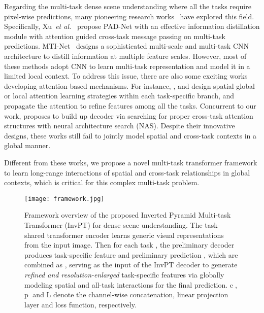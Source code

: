\documentclass[runningheads]{llncs}
\begin{document}
\par Regarding the multi-task dense scene understanding where all the tasks require pixel-wise predictions, many pioneering research works~\cite{kendall2018multi,astmt,crossstitch,nddr,padnet} have explored this field. Specifically, Xu~\textit{et al.}~\cite{padnet} propose PAD-Net with an effective information distillation module with attention guided cross-task message passing on multi-task predictions. MTI-Net~\cite{mti} designs a sophisticated  multi-scale and multi-task CNN architecture to distill information at multiple feature scales.
However, most of these methods adopt CNN to learn multi-task representation and model it in a limited local context.
To address this issue, there are also some exciting works developing attention-based mechanisms. For instance, \cite{papnet}, \cite{psd} and \cite{zhang2021transfer}
design spatial global or local attention learning strategies within each task-specific branch, and propagate the attention to refine features among all the tasks.
Concurrent to our work, \cite{atrc} proposes to build up decoder via searching for proper cross-task attention structures with neural architecture search (NAS). Despite their innovative designs, these works still fail to jointly model spatial and cross-task contexts in a global manner.

\par Different from these works, we propose a novel multi-task transformer framework to learn long-range interactions of spatial and cross-task relationships in global contexts, which is critical for this complex multi-task problem.
\begin{figure*}[!t]
	\centering
	\texttt{[image: framework.jpg]}
\vspace{-18pt}
\caption{Framework overview of the proposed Inverted Pyramid Multi-task Transformer (InvPT) for dense scene understanding.
The task-shared transformer encoder learns generic visual representations from the input image. Then for each task , the preliminary decoder produces task-specific feature  and preliminary prediction , which are combined as , serving as the input of the InvPT decoder to generate \emph{refined and resolution-enlarged} task-specific features via globally modeling spatial and all-task interactions for the final prediction. \textcircled{c},  \textcircled{p} and L denote the channel-wise concatenation, linear projection layer and loss function, respectively.}
\vspace{-22pt}
\label{fig:framework}
\end{figure*}
\end{document}
